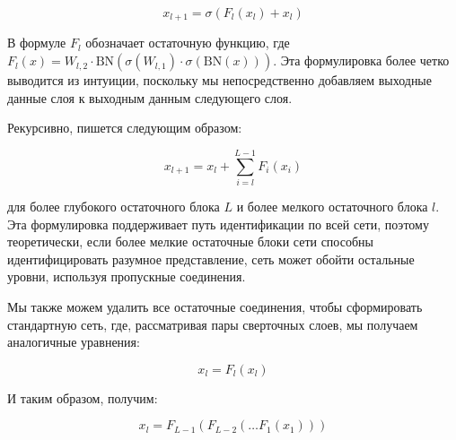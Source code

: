 \begin{equation}
    x_{l + 1} = \sigma(F_{l}(x_{l}) + x_{l})
\end{equation}

В формуле \(F_{l}\) обозначает остаточную функцию, где \(F_{l}(x) = W_{l,2} \cdot \text{BN}(\sigma(W_{l,1}) \cdot \sigma(\text{BN}(x)))\). Эта формулировка более четко выводится из интуиции, поскольку мы непосредственно добавляем выходные данные слоя к выходным данным следующего слоя.

Рекурсивно, пишется следующим образом:

\begin{equation}
    x_{l + 1} = x_{l} + \sum_{i = l}^{L - 1} F_{i}(x_{i})
\end{equation}

для более глубокого остаточного блока \(L\) и более мелкого остаточного блока \(l\). Эта формулировка поддерживает путь идентификации по всей сети, поэтому теоретически, если более мелкие остаточные блоки сети способны идентифицировать разумное представление, сеть может обойти остальные уровни, используя пропускные соединения.

Мы также можем удалить все остаточные соединения, чтобы сформировать стандартную сеть, где, рассматривая пары сверточных слоев, мы получаем аналогичные уравнения:

\begin{equation}
    x_{l} = F_{l}(x_{l})
\end{equation}

И таким образом, получим:

\begin{equation}
    x_{l} = F_{L - 1}(F_{L - 2}(\ldots F_{1}(x_{1})))
\end{equation}
